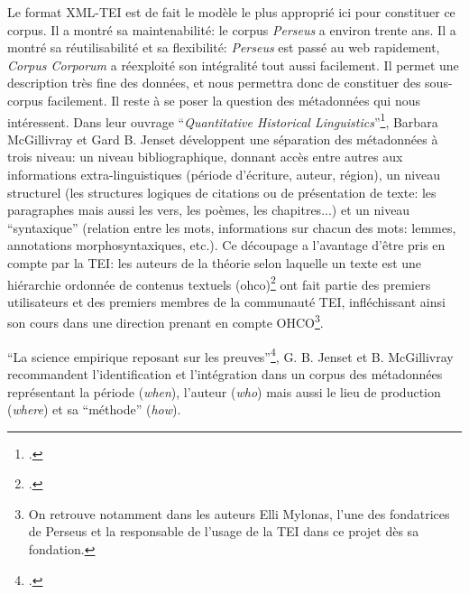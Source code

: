Le format XML-TEI est de fait le modèle le plus approprié ici pour constituer ce corpus. Il a montré sa maintenabilité: le corpus \textit{Perseus} a environ trente ans. Il a montré sa réutilisabilité et sa flexibilité: \textit{Perseus} est passé au web rapidement, \textit{Corpus Corporum} a réexploité son intégralité tout aussi facilement. Il permet une description très fine des données, et nous permettra donc de constituer des sous-corpus facilement. Il reste à se poser la question des métadonnées qui nous intéressent. Dans leur ouvrage \enquote{\textit{Quantitative Historical Linguistics}}\footcite{gillivray_quantitative_2017}, Barbara McGillivray et Gard B. Jenset développent une séparation des métadonnées à trois niveau: un niveau bibliographique, donnant accès entre autres aux informations extra-linguistiques (période d'écriture, auteur, région), un niveau structurel (les structures logiques de citations ou de présentation de texte: les paragraphes mais aussi les vers, les poèmes, les chapitres...) et un niveau \enquote{syntaxique} (relation entre les mots, informations sur chacun des mots: lemmes, annotations morphosyntaxiques, etc.). Ce découpage a l'avantage d'être pris en compte par la TEI: les auteurs de la théorie selon laquelle un texte est une hiérarchie ordonnée de contenus textuels (\acrshort{ohco})\footcite{derose_what_1990} ont fait partie des premiers utilisateurs et des premiers membres de la communauté TEI, infléchissant ainsi son cours dans une direction prenant en compte OHCO\footnote{On retrouve notamment dans les auteurs Elli Mylonas, l'une des fondatrices de Perseus et la responsable de l'usage de la TEI dans ce projet dès sa fondation.}.

\enquote{La science empirique reposant sur les preuves}\footcite[p.~98]{gillivray_quantitative_2017}, G. B. Jenset et B. McGillivray recommandent l'identification et l'intégration dans un corpus des métadonnées représentant la période (\textit{when}), l'auteur (\textit{who}) mais aussi le lieu de production (\textit{where}) et sa \enquote{méthode} (\textit{how}). 

